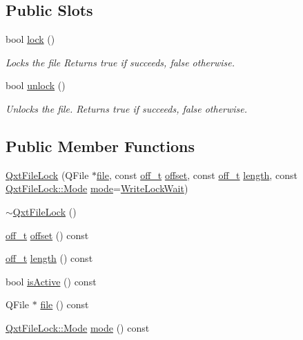 \subsection*{Public Slots}
\begin{DoxyCompactItemize}
\item 
bool \hyperlink{class_qxt_file_lock_a84af0691c49c83fb6d3c3352c56ba48f}{lock} ()
\begin{DoxyCompactList}\small\item\em Locks the file Returns {\ttfamily true} if succeeds, {\ttfamily false} otherwise. \end{DoxyCompactList}\item 
bool \hyperlink{class_qxt_file_lock_ae9e31b41e41520c29cf64634d099cf05}{unlock} ()
\begin{DoxyCompactList}\small\item\em Unlocks the file. Returns {\ttfamily true} if succeeds, {\ttfamily false} otherwise. \end{DoxyCompactList}\end{DoxyCompactItemize}
\subsection*{Public Member Functions}
\begin{DoxyCompactItemize}
\item 
\hyperlink{class_qxt_file_lock_abd47ac230f3f7119531d4efcfda30a97}{Qxt\-File\-Lock} (Q\-File $\ast$\hyperlink{class_qxt_file_lock_afeaea618cc084130c70c6b6f93b4b2f3}{file}, const \hyperlink{qxtfilelock_8h_af83497edef361523a95b06deda0b4c2d}{off\-\_\-t} \hyperlink{glext_8h_ae1b92ae085ddef4b1cdca7d749339fb0}{offset}, const \hyperlink{qxtfilelock_8h_af83497edef361523a95b06deda0b4c2d}{off\-\_\-t} \hyperlink{glext_8h_a3c8469415bbc83dd1341af15c67f1cef}{length}, const \hyperlink{class_qxt_file_lock_a98ad3e1055038fd611ad64755f794835}{Qxt\-File\-Lock\-::\-Mode} \hyperlink{glext_8h_a1e71d9c196e4683cc06c4b54d53f7ef5}{mode}=\hyperlink{class_qxt_file_lock_a98ad3e1055038fd611ad64755f794835a45a077cb75b9087e319da24486005ba2}{Write\-Lock\-Wait})
\item 
\hyperlink{class_qxt_file_lock_a314341b3e163001bffa6066d093e8898}{$\sim$\-Qxt\-File\-Lock} ()
\item 
\hyperlink{qxtfilelock_8h_af83497edef361523a95b06deda0b4c2d}{off\-\_\-t} \hyperlink{class_qxt_file_lock_a7b674bb5093f84389b4ed542d9c359d4}{offset} () const 
\item 
\hyperlink{qxtfilelock_8h_af83497edef361523a95b06deda0b4c2d}{off\-\_\-t} \hyperlink{class_qxt_file_lock_a7ad141d709ef8637e6ff9b16e1c6474e}{length} () const 
\item 
bool \hyperlink{class_qxt_file_lock_a0272626fd8af9ac7b5808fcd27f21260}{is\-Active} () const 
\item 
Q\-File $\ast$ \hyperlink{class_qxt_file_lock_afeaea618cc084130c70c6b6f93b4b2f3}{file} () const 
\item 
\hyperlink{class_qxt_file_lock_a98ad3e1055038fd611ad64755f794835}{Qxt\-File\-Lock\-::\-Mode} \hyperlink{class_qxt_file_lock_a4ce56493f542690f3eefa8ec25d293bf}{mode} () const 
\end{DoxyCompactItemize}


